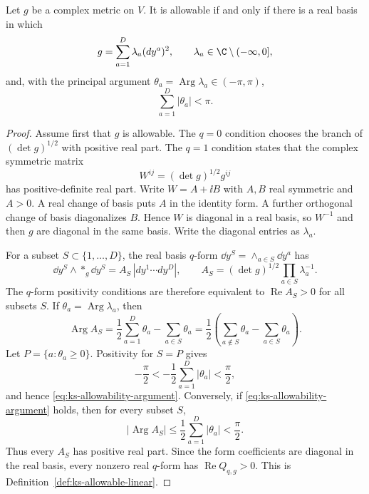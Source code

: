 \begin{theorem}
\label{thm:ks-allowability-argument}
Let \(g\) be a complex metric on \(V\).  It is allowable if and only if there
is a real basis in which
\[
  g=\sum_{a=1}^D \lambda_a (dy^a)^2,
  \qquad
  \lambda_a\in\C\setminus(-\infty,0],
\]
and, with the principal argument \(\theta_a=\operatorname{Arg}\lambda_a\in
(-\pi,\pi)\),
\begin{equation}
  \sum_{a=1}^D |\theta_a|<\pi .
  \label{eq:ks-allowability-argument}
\end{equation}
\end{theorem}

\begin{proof}
Assume first that \(g\) is allowable.  The \(q=0\) condition chooses the
branch of \((\det g)^{1/2}\) with positive real part.  The \(q=1\) condition
states that the complex symmetric matrix
\[
  W^{ij}=(\det g)^{1/2}g^{ij}
\]
has positive-definite real part.  Write \(W=A+\ii B\) with \(A,B\) real
symmetric and \(A>0\).  A real change of basis puts \(A\) in the identity
form.  A further orthogonal change of basis diagonalizes \(B\).  Hence \(W\)
is diagonal in a real basis, so \(W^{-1}\) and then \(g\) are diagonal in the
same basis.  Write the diagonal entries as \(\lambda_a\).

For a subset \(S\subset\{1,\ldots,D\}\), the real basis \(q\)-form
\(\dd y^S=\wedge_{a\in S}\dd y^a\) has
\begin{equation}
  \dd y^S\wedge *_g\dd y^S
  =
  A_S\,|dy^1\cdots dy^D|,
  \qquad
  A_S=(\det g)^{1/2}\prod_{a\in S}\lambda_a^{-1}.
  \label{eq:ks-form-coefficient}
\end{equation}
The \(q\)-form positivity conditions are therefore equivalent to
\(\operatorname{Re}A_S>0\) for all subsets \(S\).  If
\(\theta_a=\operatorname{Arg}\lambda_a\), then
\[
  \operatorname{Arg} A_S
  =
  \frac12\sum_{a=1}^D\theta_a-\sum_{a\in S}\theta_a
  =
  \frac12\left(\sum_{a\notin S}\theta_a-\sum_{a\in S}\theta_a\right).
\]
Let \(P=\{a:\theta_a\ge0\}\).  Positivity for \(S=P\) gives
\[
  -\frac{\pi}{2}
  <
  -\frac12\sum_{a=1}^D|\theta_a|
  <
  \frac{\pi}{2},
\]
and hence \eqref{eq:ks-allowability-argument}.  Conversely, if
\eqref{eq:ks-allowability-argument} holds, then for every subset \(S\),
\[
  |\operatorname{Arg}A_S|
  \le
  \frac12\sum_{a=1}^D|\theta_a|
  <
  \frac{\pi}{2}.
\]
Thus every \(A_S\) has positive real part.  Since the form coefficients are
diagonal in the real basis, every nonzero real \(q\)-form has
\(\operatorname{Re}Q_{q,g}>0\).  This is
Definition~\ref{def:ks-allowable-linear}.
\end{proof}

